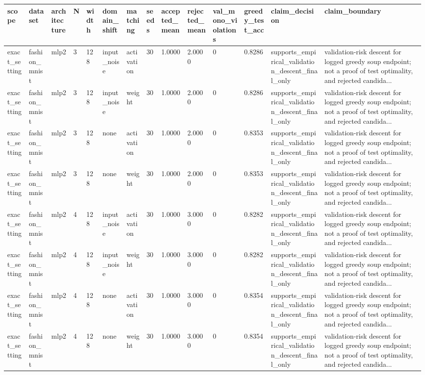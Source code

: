 \begin{tabular}{llllllllllllll}
\toprule
scope & dataset & architecture & N & width & domain\_shift & matching & seeds & accepted\_mean & rejected\_mean & val\_mono\_violations & greedy\_test\_acc & claim\_decision & claim\_boundary \\
\midrule
exact\_setting & fashion\_mnist & mlp2 & 3 & 128 & input\_noise & activation & 30 & 1.0000 & 2.0000 & 0 & 0.8286 & supports\_empirical\_validation\_descent\_final\_only & validation-risk descent for logged greedy soup endpoint; not a proof of test optimality, and rejected candida... \\
exact\_setting & fashion\_mnist & mlp2 & 3 & 128 & input\_noise & weight & 30 & 1.0000 & 2.0000 & 0 & 0.8286 & supports\_empirical\_validation\_descent\_final\_only & validation-risk descent for logged greedy soup endpoint; not a proof of test optimality, and rejected candida... \\
exact\_setting & fashion\_mnist & mlp2 & 3 & 128 & none & activation & 30 & 1.0000 & 2.0000 & 0 & 0.8353 & supports\_empirical\_validation\_descent\_final\_only & validation-risk descent for logged greedy soup endpoint; not a proof of test optimality, and rejected candida... \\
exact\_setting & fashion\_mnist & mlp2 & 3 & 128 & none & weight & 30 & 1.0000 & 2.0000 & 0 & 0.8353 & supports\_empirical\_validation\_descent\_final\_only & validation-risk descent for logged greedy soup endpoint; not a proof of test optimality, and rejected candida... \\
exact\_setting & fashion\_mnist & mlp2 & 4 & 128 & input\_noise & activation & 30 & 1.0000 & 3.0000 & 0 & 0.8282 & supports\_empirical\_validation\_descent\_final\_only & validation-risk descent for logged greedy soup endpoint; not a proof of test optimality, and rejected candida... \\
exact\_setting & fashion\_mnist & mlp2 & 4 & 128 & input\_noise & weight & 30 & 1.0000 & 3.0000 & 0 & 0.8282 & supports\_empirical\_validation\_descent\_final\_only & validation-risk descent for logged greedy soup endpoint; not a proof of test optimality, and rejected candida... \\
exact\_setting & fashion\_mnist & mlp2 & 4 & 128 & none & activation & 30 & 1.0000 & 3.0000 & 0 & 0.8354 & supports\_empirical\_validation\_descent\_final\_only & validation-risk descent for logged greedy soup endpoint; not a proof of test optimality, and rejected candida... \\
exact\_setting & fashion\_mnist & mlp2 & 4 & 128 & none & weight & 30 & 1.0000 & 3.0000 & 0 & 0.8354 & supports\_empirical\_validation\_descent\_final\_only & validation-risk descent for logged greedy soup endpoint; not a proof of test optimality, and rejected candida... \\

\end{tabular}
